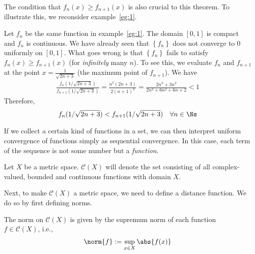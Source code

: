 \documentclass[thmcnt=section, 12pt]{elegantbook}
\begin{document}
\par The condition that $f_n(x) \geq f_{n+1}(x)$ is also crucial to this theorem. To illustrate this, we reconsider example~\ref{eg:1}.

\begin{example}
    Let $f_n$ be the same function in example~\ref{eg:1}. The domain $[0,1]$ is compact and $f_n$ is continuous. We have already seen that $\left\{f_n\right\}$ does not converge to $0$ uniformly on $[0,1]$. What goes wrong is that $\left\{f_n\right\}$ fails to satisfy $f_n(x) \geq f_{n+1}(x)$ (for \textit{infinitely} many $n$). To see this, we evaluate $f_n$ and $f_{n+1}$ at the point $x = \frac{1}{\sqrt{2n+3}}$ (the maximum point of $f_{n+1}$). We have 
    \begin{align*}
        \frac{f_{n}(1/\sqrt{2n+3})}{f_{n+1}(1/\sqrt{2n+3})}
        = \frac{n^2(2n+3)}{2(n+1)^3}
        = \frac{2n^3 + 3n^2}{2n^3 + 6n^2 + 6n + 2}
        < 1
    \end{align*}
    Therefore,
    \begin{align*}
        f_{n}(1/\sqrt{2n+3}) < f_{n+1}(1/\sqrt{2n+3}) 
        \quad \forall n \in \Ns
    \end{align*}
\end{example}


\par If we collect a certain kind of functions in a set, we can then interpret uniform convergence of functions simply as sequential convergence. In this case, each term of the sequence is not some number but a \textit{function}.

\begin{definition}
    Let $X$ be a metric space. $\mathscr{C}(X)$ will denote the set consisting of all complex-valued, bounded and continuous functions with domain $X$.
\end{definition}


\par Next, to make $\mathscr{C}(X)$ a metric space, we need to define a distance function. We do so by first defining norms.

\begin{definition} \label{def:5}
    The norm on $\mathscr{C}(X)$ is given by the supremum norm of each function $f \in \mathscr{C}(X)$, i.e.,  
    \begin{align*}
        \norm{f} := \sup_{x \in X}\abs{f(x)}
    \end{align*}
\end{definition}
\end{document}

